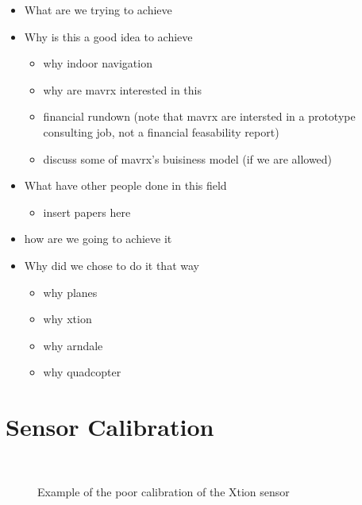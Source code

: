 \documentclass[]{article}
\begin{document}
{\begin{itemize}
	\item What are we trying to achieve
	\item Why is this a good idea to achieve
	\begin{itemize}
		\item why indoor navigation
		\item why are mavrx interested in this
		\item financial rundown (note that mavrx are intersted in a prototype consulting job, not a financial feasability report)
		\item discuss some of mavrx's buisiness model (if we are allowed)
	\end{itemize}
	\item What have other people done in this field
	\begin{itemize}
		\item insert papers here
	\end{itemize}
	\item how are we going to achieve it
	\item Why did we chose to do it that way
	\begin{itemize}
		\item why planes
		\item why xtion
		\item why arndale
		\item why quadcopter
	\end{itemize}
\end{itemize}


\section{Sensor Calibration} %

\begin{figure}
\centering     %
{} \,\,\,\,
\caption{Example of the poor calibration of the Xtion sensor}
\label{fig:uncal5m}
\end{figure}


}
\end{document}
